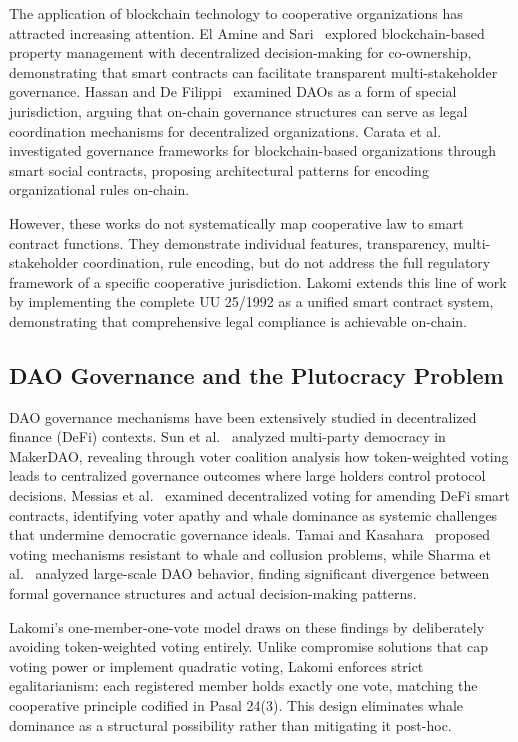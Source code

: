 \documentclass[conference]{IEEEtran}
\begin{document}
The application of blockchain technology to cooperative organizations has attracted increasing attention. El Amine and Sari~\cite{elamine2024blockchain} explored blockchain-based property management with decentralized decision-making for co-ownership, demonstrating that smart contracts can facilitate transparent multi-stakeholder governance. Hassan and De Filippi~\cite{hassan2021dao} examined DAOs as a form of special jurisdiction, arguing that on-chain governance structures can serve as legal coordination mechanisms for decentralized organizations. Carata et al.~\cite{carata2024smart} investigated governance frameworks for blockchain-based organizations through smart social contracts, proposing architectural patterns for encoding organizational rules on-chain.

However, these works do not systematically map cooperative law to smart contract functions. They demonstrate individual features, transparency, multi-stakeholder coordination, rule encoding, but do not address the full regulatory framework of a specific cooperative jurisdiction. Lakomi extends this line of work by implementing the complete UU 25/1992 as a unified smart contract system, demonstrating that comprehensive legal compliance is achievable on-chain.

\subsection{DAO Governance and the Plutocracy Problem}

DAO governance mechanisms have been extensively studied in decentralized finance (DeFi) contexts. Sun et al.~\cite{sun2022multiparty} analyzed multi-party democracy in MakerDAO, revealing through voter coalition analysis how token-weighted voting leads to centralized governance outcomes where large holders control protocol decisions. Messias et al.~\cite{messias2023understanding} examined decentralized voting for amending DeFi smart contracts, identifying voter apathy and whale dominance as systemic challenges that undermine democratic governance ideals. Tamai and Kasahara~\cite{tamai2024dao} proposed voting mechanisms resistant to whale and collusion problems, while Sharma et al.~\cite{sharma2024future} analyzed large-scale DAO behavior, finding significant divergence between formal governance structures and actual decision-making patterns.

Lakomi's one-member-one-vote model draws on these findings by deliberately avoiding token-weighted voting entirely. Unlike compromise solutions that cap voting power or implement quadratic voting, Lakomi enforces strict egalitarianism: each registered member holds exactly one vote, matching the cooperative principle codified in Pasal 24(3). This design eliminates whale dominance as a structural possibility rather than mitigating it post-hoc.
\end{document}
